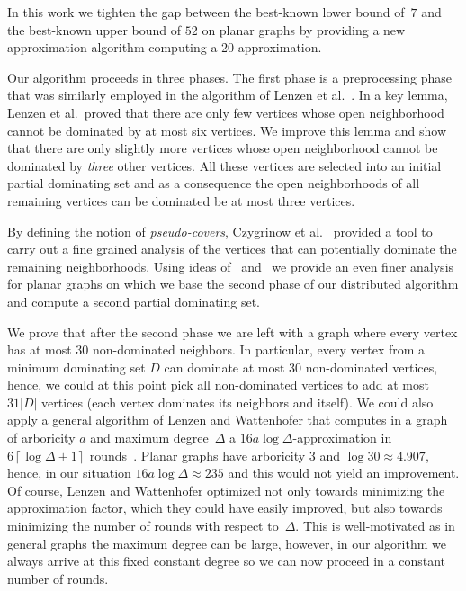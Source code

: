 In this work we tighten the gap between the best-known
lower bound of~$7$ and the best-known upper bound of $52$ on planar graphs
by providing a new approximation algorithm computing a 20\hspace{1pt}-\hspace{1pt}approximation.

Our algorithm proceeds in three phases.
The first phase is a preprocessing phase that was similarly employed in the
algorithm of Lenzen et al.~\cite{lenzen2013distributed}. In a key lemma,
Lenzen et al.\ proved that there are only few vertices whose open neighborhood
cannot be dominated by at most six vertices. We improve this lemma and show
that there are only slightly more vertices whose open neighborhood cannot be
dominated by \emph{three} other vertices. All these vertices are selected into an
initial partial dominating set and as a consequence the open neighborhoods of all
remaining vertices can be dominated be at most three vertices.

By defining the notion of \emph{pseudo-covers},
Czygrinow et  al.~\cite{czygrinow2018distributed} provided a tool to carry
out a fine grained analysis of the vertices that can potentially dominate
the remaining neighborhoods.
Using ideas of~\cite{kublenz2020distributed} and~\cite{siebertz2019greedy}
we provide an even finer analysis for planar graphs on which we
base the second phase of our distributed algorithm and compute a
second partial dominating set.

\pagebreak

We prove that
after the second phase we are left with a graph where every vertex
has at most 30 non-dominated neighbors. In particular, every vertex
from a minimum dominating set $D$ can dominate at most 30
non-dominated vertices, hence, we could at this point pick all
non-dominated vertices to add at most $31|D|$ vertices (each
vertex dominates its neighbors and itself). We could
also apply a general algorithm of Lenzen and Wattenhofer
that computes in a graph of arboricity $a$ and
maximum degree~$\Delta$ a \mbox{$16a\log \Delta$-approximation}
in $6\left\lceil \log \Delta+1\right\rceil$ rounds~\cite{lenzen2010minimum}.
Planar graphs have arboricity $3$ and $\log 30\approx 4.907$, hence,
in our situation $16a\log \Delta\approx 235$ and this would not yield an improvement.
Of course, Lenzen and Wattenhofer
optimized not only towards minimizing the approximation factor, which
they could have easily improved, but
also towards minimizing the number of rounds with respect to~$\Delta$. This is well-motivated as in general graphs the maximum
degree can be large, however, in our algorithm
we always arrive at this fixed constant
degree so we can now proceed in a constant number of rounds.


